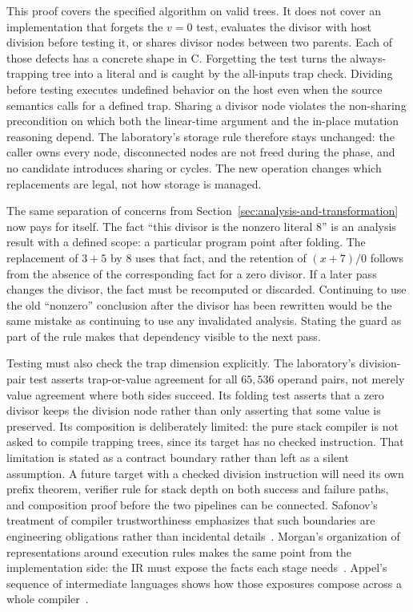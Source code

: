 This proof covers the specified algorithm on valid trees.
It does not cover an implementation that forgets the $v=0$ test, evaluates the divisor with host division before testing it, or shares divisor nodes between two parents.
Each of those defects has a concrete shape in C.
Forgetting the test turns the always-trapping tree into a literal and is caught by the all-inputs trap check.
Dividing before testing executes undefined behavior on the host even when the source semantics calls for a defined trap.
Sharing a divisor node violates the non-sharing precondition on which both the linear-time argument and the in-place mutation reasoning depend.
The laboratory's storage rule therefore stays unchanged: the caller owns every node, disconnected nodes are not freed during the phase, and no candidate introduces sharing or cycles.
The new operation changes which replacements are legal, not how storage is managed.

The same separation of concerns from Section~\ref{sec:analysis-and-transformation} now pays for itself.
The fact \enquote{this divisor is the nonzero literal $8$} is an analysis result with a defined scope: a particular program point after folding.
The replacement of $3+5$ by $8$ uses that fact, and the retention of $(x+7)/0$ follows from the absence of the corresponding fact for a zero divisor.
If a later pass changes the divisor, the fact must be recomputed or discarded.
Continuing to use the old \enquote{nonzero} conclusion after the divisor has been rewritten would be the same mistake as continuing to use any invalidated analysis.
Stating the guard as part of the rule makes that dependency visible to the next pass.

Testing must also check the trap dimension explicitly.
The laboratory's division-pair test asserts trap-or-value agreement for all $65{,}536$ operand pairs, not merely value agreement where both sides succeed.
Its folding test asserts that a zero divisor keeps the division node rather than only asserting that some value is preserved.
Its composition is deliberately limited: the pure stack compiler is not asked to compile trapping trees, since its target has no checked instruction.
That limitation is stated as a contract boundary rather than left as a silent assumption.
A future target with a checked division instruction will need its own prefix theorem, verifier rule for stack depth on both success and failure paths, and composition proof before the two pipelines can be connected.
Safonov's treatment of compiler trustworthiness emphasizes that such boundaries are engineering obligations rather than incidental details~\cite{safonov-2010-trustworthy}.
Morgan's organization of representations around execution rules makes the same point from the implementation side: the IR must expose the facts each stage needs~\cite[Chapter~4]{morgan-1998-optimizing}.
Appel's sequence of intermediate languages shows how those exposures compose across a whole compiler~\cite{appel-1998-modern}.
